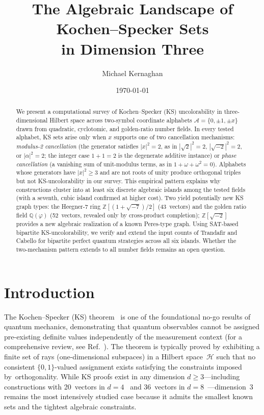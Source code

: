 \documentclass[12pt,a4paper]{article}
\title{The Algebraic Landscape of Kochen--Specker Sets\\in Dimension Three}
\author{Michael Kernaghan}
\date{\today}
\newcommand{\Z}{\mathbb{Z}}
\newcommand{\Q}{\mathbb{Q}}
\begin{document}
\maketitle

\begin{abstract}
We present a computational survey of Kochen--Specker (KS) uncolorability in three-dimensional Hilbert space across two-symbol coordinate alphabets $\mathcal{A} = \{0, \pm 1, \pm x\}$ drawn from quadratic, cyclotomic, and golden-ratio number fields. In every tested alphabet, KS sets arise only when $x$ supports one of two cancellation mechanisms: \emph{modulus-2 cancellation} (the generator satisfies $|x|^2 = 2$, as in $|\sqrt{2}|^2=2$, $|\sqrt{-2}|^2=2$, or $|\alpha|^2=2$; the integer case $1+1=2$ is the degenerate additive instance) or \emph{phase cancellation} (a vanishing sum of unit-modulus terms, as in $1+\omega+\omega^2=0$). Alphabets whose generators have $|x|^2 \geq 3$ and are not roots of unity produce orthogonal triples but not KS-uncolorability in our survey. This empirical pattern explains why constructions cluster into at least six discrete algebraic islands among the tested fields (with a seventh, cubic island confirmed at higher cost). Two yield potentially new KS graph types: the Heegner-7 ring $\Z[(1+\sqrt{-7})/2]$ (43~vectors) and the golden ratio field $\Q(\varphi)$ (52~vectors, revealed only by cross-product completion); $\Z[\sqrt{-2}]$ provides a new algebraic realization of a known Peres-type graph. Using SAT-based bipartite KS-uncolorability, we verify and extend the input counts of Trandafir and Cabello for bipartite perfect quantum strategies across all six islands. Whether the two-mechanism pattern extends to all number fields remains an open question.
\end{abstract}

\section{Introduction}

The Kochen--Specker (KS) theorem~\cite{KochenSpecker1967} is one of the foundational no-go results of quantum mechanics, demonstrating that quantum observables cannot be assigned pre-existing definite values independently of the measurement context (for a comprehensive review, see Ref.~\cite{Budroni2022}). The theorem is typically proved by exhibiting a finite set of rays (one-dimensional subspaces) in a Hilbert space~$\mathcal{H}$ such that no consistent $\{0,1\}$-valued assignment exists satisfying the constraints imposed by~orthogonality.  While KS proofs exist in any dimension $d \geq 3$---including constructions with 20~vectors in $d = 4$~\cite{Kernaghan1994} and 36~vectors in $d = 8$~\cite{KernaghanPeres1995}---dimension~3 remains the most intensively studied case because it admits the smallest known sets and the tightest algebraic constraints.
\end{document}
